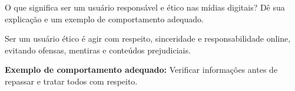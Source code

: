 \documentclass[11pt]{article}
\begin{document}

\begin{tcolorbox}[colback=blue!10,colframe=blue!60!black,
title=\textbf{Questão 10 – Uso Ético da Internet}]
O que significa ser um usuário responsável e ético nas mídias digitais?  
Dê sua explicação e um exemplo de comportamento adequado.
\end{tcolorbox}

\begin{tcolorbox}[colback=green!10,colframe=green!60!black,
title=\textbf{Solução 10 — Explicação }]
Ser um usuário ético é agir com respeito, sinceridade e responsabilidade online,
evitando ofensas, mentiras e conteúdos prejudiciais.

\textbf{Exemplo de comportamento adequado:}  
Verificar informações antes de repassar e tratar todos com respeito.
\end{tcolorbox}
\end{document}
